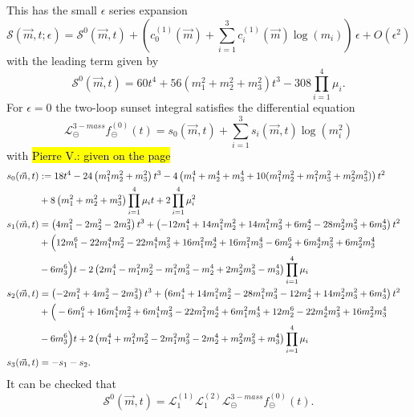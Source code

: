 \documentclass[a4paper,12pt]{article}
\numberwithin{equation}{section}
\numberwithin{figure}{section}
\def\su{\circleddash}
\newcommand{\pvnote}[1]{\sethlcolor{bubblegum} \protect\hl{Pierre V.: #1} \sethlcolor{yellow}}
\begin{document}
This has the small $\epsilon$ series expansion
\begin{equation}
    \mathscr{S}(\vec m,t;\epsilon)=\mathscr{S}^0(\vec m,t)
    +\left(c^{(1)}_0(\vec m)+
    \sum_{i=1}^3  c^{(1)}_i(\vec m)\log(m_i)\right)\,  \epsilon+O(\epsilon^2)
\end{equation}
with  the leading term given by
   \begin{equation}
   \mathscr{S}^0(\vec m,t)=60 t^{4}+56\left( m_{1}^{2}+ m_{2}^{2}+
     m_{3}^{2}\right) t^{3}
   -308 \prod_{i=1}^4 \mu_i.
 \end{equation}
For $\epsilon=0$ the two-loop sunset integral satisfies  the
differential equation
\begin{equation}
  \mathscr{L}^{3-mass}_\su f_\su^{(0)}(t)= s_0(\vec m,t)+ \sum_{i=1}^3
  s_i(\vec m,t)\log(m_i^2)  
\end{equation}
with \pvnote{given on the page}
\begin{align}
  s_0(\vec m,t)&:=18 t^{4}-24\left(m_{1}^{2}m_{2}^{2}+
       m_{3}^{2}\right) t^{3}-4\left( m_{1}^{4}+m_2^4+m_3^4+10(
       m_{1}^{2} m_{2}^{2}+ m_{1}^{2}
       m_{3}^{2}+m_{2}^{2}
       m_{3}^{2})\right) t^{2}\cr
       &+8
       \left(m_{1}^{2}+m_{2}^{2}+m_{3}^{2}\right)\prod_{i=1}^4\mu_i
       t +2 \prod_{i=1}^4\mu_i^2 \cr
  s_1(\vec m,t)&=\left(4 m_{1}^{2}-2 m_{2}^{2}-2 m_{3}^{2}\right)
       t^{3}+\left(-12 m_{1}^{4}+14 m_{1}^{2} m_{2}^{2}+14 m_{1}^{2}
       m_{3}^{2}+6 m_{2}^{4}-28 m_{2}^{2} m_{3}^{2}+6 m_{3}^{4}\right)
       t^{2}\cr
       &+\Big(12 m_{1}^{6}-22 m_{1}^{4} m_{2}^{2}-22 m_{1}^{4} m_{3}^{2}+16 m_{1}^{2} m_{2}^{4}+16 m_{1}^{2} m_{3}^{4}-6 m_{2}^{6}+6 m_{2}^{4} m_{3}^{2}+6 m_{2}^{2} m_{3}^{4}\cr&-6 m_{3}^{6}\Big) t-2 \left(2 m_{1}^{4}-m_{1}^{2} m_{2}^{2}-m_{1}^{2} m_{3}^{2}-m_{2}^{4}+2 m_{2}^{2} m_{3}^{2}-m_{3}^{4}\right) \prod_{i=1}^4\mu_i\cr
       s_2(\vec m,t)&=\left(-2 m_{1}^{2}+4 m_{2}^{2}-2 m_{3}^{2}\right)
            t^{3}+\left(6 m_{1}^{4}+14 m_{1}^{2} m_{2}^{2}-28
            m_{1}^{2} m_{3}^{2}-12 m_{2}^{4}+14 m_{2}^{2} m_{3}^{2}+6
            m_{3}^{4}\right) t^{2}\cr
            &+\Big(-6 m_{1}^{6}+16 m_{1}^{4} m_{2}^{2}+6 m_{1}^{4} m_{3}^{2}-22 m_{1}^{2} m_{2}^{4}+6 m_{1}^{2} m_{3}^{4}+12 m_{2}^{6}-22 m_{2}^{4} m_{3}^{2}+16 m_{2}^{2} m_{3}^{4}\cr&-6 m_{3}^{6}\Big) t +2 \left(m_{1}^{4}+m_{1}^{2} m_{2}^{2}-2 m_{1}^{2} m_{3}^{2}-2 m_{2}^{4}+m_{2}^{2} m_{3}^{2}+m_{3}^{4}\right) \prod_{i=1}^4\mu_i
\cr
            s_3(\vec m,t)&=-s_1-s_2.
\end{align}
It can be checked that 
\begin{equation}
  \mathscr{S}^0(\vec m,t)=   \mathscr{L}^{(1)}_1
     \mathscr{L}^{(2)}_1    \mathscr{L}^{3-mass}_\su  f_\su^{(0)}(t).
\end{equation}
\end{document}
